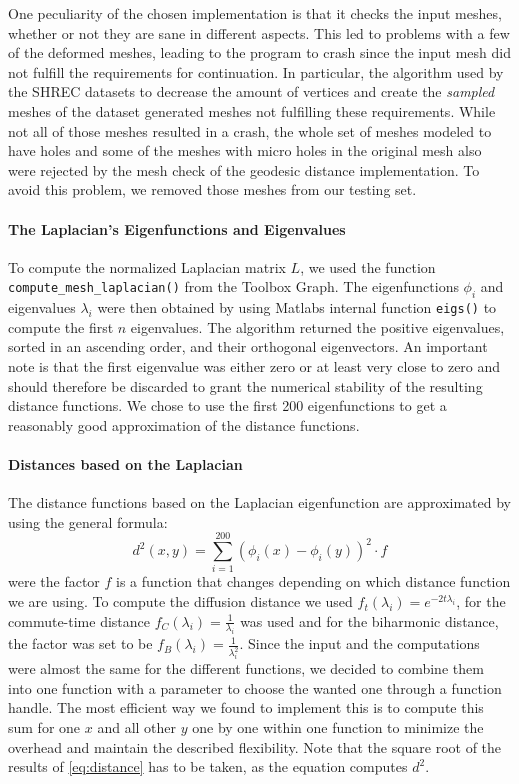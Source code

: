 One peculiarity of the chosen implementation is that it checks the input meshes, whether or not they are sane in different aspects.
This led to problems with a few of the deformed meshes, leading to the program to crash since the input mesh did not fulfill the requirements for continuation.
In particular, the algorithm used by the SHREC datasets to decrease the amount of vertices and create the \textit{sampled} meshes of the dataset generated meshes not fulfilling these requirements.
While not all of those meshes resulted in a crash, the whole set of meshes modeled to have holes and some of the meshes with micro holes in the original mesh also were rejected by the mesh check of the geodesic distance implementation.
To avoid this problem, we removed those meshes from our testing set.

\paragraph{The Laplacian's Eigenfunctions and Eigenvalues}
To compute the normalized Laplacian matrix $L$, we used the function \texttt{compute\_mesh\_laplacian()} from the Toolbox Graph.
The eigenfunctions $\phi_i$ and eigenvalues $\lambda_i$ were then obtained by using Matlabs internal function \texttt{eigs()} to compute the first $n$ eigenvalues.
The algorithm returned the positive eigenvalues, sorted in an ascending order, and their orthogonal eigenvectors.
An important note is that the first eigenvalue was either zero or at least very close to zero and should therefore be discarded to grant the numerical stability of the resulting distance functions.
We chose to use the first 200 eigenfunctions to get a reasonably good approximation of the distance functions.

\paragraph{Distances based on the Laplacian}
The distance functions based on the Laplacian eigenfunction are approximated by using the general formula:
\begin{equation}
	d^2(x,y) = \sum_{i=1}^{200} (\phi_i(x) - \phi_i(y))^2 \cdot f
	\label{eq:distance}
\end{equation}
were the factor $f$ is a function that changes depending on which distance function we are using.
To compute the diffusion distance we used $f_t(\lambda_i) = e^{-2t\lambda_i}$, for the commute-time distance $f_C(\lambda_i) = \frac{1}{\lambda_i}$ was used and for the biharmonic distance, the factor was set to be $f_B(\lambda_i) = \frac{1}{\lambda_i^2}$.
Since the input and the computations were almost the same for the different functions, we decided to combine them into one function with a parameter to choose the wanted one through a function handle.
The most efficient way we found to implement this is to compute this sum for one $x$ and all other $y$ one by one within one function to minimize the overhead and maintain the described flexibility.
Note that the square root of the results of \eqref{eq:distance} has to be taken, as the equation computes $d^2$.

